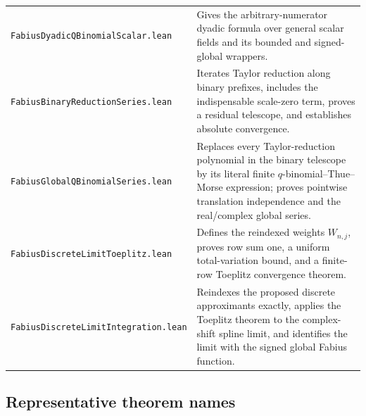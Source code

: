 \documentclass[11pt]{article}
\theoremstyle{definition}
\newcommand{\lean}[1]{\nolinkurl{#1}}
\begin{document}
\begin{longtable}{>{\raggedright\arraybackslash\small}p{} >{\raggedright\arraybackslash}p{}}
\addlinespace
\lean{FabiusDyadicQBinomialScalar.lean} & Gives the arbitrary-numerator dyadic formula over general scalar fields and its bounded and signed-global wrappers. \\
\addlinespace
\lean{FabiusBinaryReductionSeries.lean} & Iterates Taylor reduction along binary prefixes, includes the indispensable scale-zero term, proves a residual telescope, and establishes absolute convergence. \\
\addlinespace
\lean{FabiusGlobalQBinomialSeries.lean} & Replaces every Taylor-reduction polynomial in the binary telescope by its literal finite $q$-binomial--Thue--Morse expression; proves pointwise translation independence and the real/complex global series. \\
\addlinespace
\lean{FabiusDiscreteLimitToeplitz.lean} & Defines the reindexed weights $W_{n,j}$, proves row sum one, a uniform total-variation bound, and a finite-row Toeplitz convergence theorem. \\
\addlinespace
\lean{FabiusDiscreteLimitIntegration.lean} & Reindexes the proposed discrete approximants exactly, applies the Toeplitz theorem to the complex-shift spline limit, and identifies the limit with the signed global Fabius function. \\
\bottomrule
\end{longtable}

\subsection{Representative theorem names}
\end{document}
